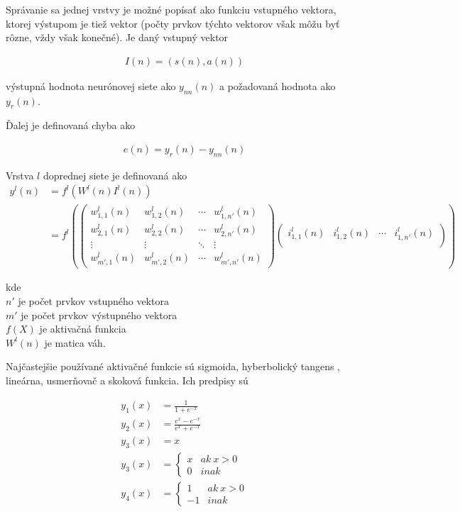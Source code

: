 Správanie sa jednej vrstvy je možné popísať ako funkciu vstupného vektora,
ktorej výstupom je tiež vektor (počty prvkov týchto vektorov však môžu byť rôzne,
vždy však konečné).
Je daný vstupný vektor

\begin{align}
I(n) = (s(n), a(n))
\label{eq:nn_input_vector}
\end{align}

výstupná hodnota neurónovej siete ako $y_{nn}(n)$ a požadovaná hodnota ako $y_{r}(n)$.

Ďalej je definovaná chyba ako

\begin{align}
e(n) = y_{r}(n) - y_{nn}(n)
\label{eq:nn_error}
\end{align}

Vrstva $l$ doprednej siete je definovaná ako
\begin{align}
y^l(n) &= f^l\left(W^l(n)I^l(n)\right) \nonumber \\
 &= f^l\left(
 \begin{pmatrix}
  w^l_{1,1}(n) & w^l_{1,2}(n) & \cdots & w^l_{1,n'}(n) \\
  w^l_{2,1}(n) & w^l_{2,2}(n) & \cdots & w^l_{2,n'}(n) \\
  \vdots  & \vdots  & \ddots & \vdots  \\
  w^l_{m',1}(n)  & w^l_{m',2}(n)  & \cdots & w^l_{m',n'}(n)
 \end{pmatrix}
 \begin{pmatrix}
  i^l_{1,1}(n) & i^l_{1,2}(n) & \cdots & i^l_{1,n'}(n) \\
 \end{pmatrix}
 \right)
 \label{eq:nn_layer}
\end{align}

kde \\
$n'$ je počet prvkov vstupného vektora \\
$m'$ je počet prvkov výstupného vektora \\
$f(X)$ je aktivačná funkcia \\
$W^l(n)$ je matica váh.

Najčastejšie používané aktivačné funkcie sú sigmoida, hyberbolický tangens , lineárna,
usmerňovač a skoková funkcia. Ich predpisy sú

\begin{align}
y_1(x) &= \frac{1}{1+e^{-x}} \\
y_2(x) &= \frac{e^{x} - e^{-x}}{e^{x} + e^{-x}} \\
y_3(x) &= x \\
y_3(x) &= \left\{
	\begin{array}{ll}
		x  & ak \ x > 0 \\
		0 & inak
	\end{array}
\right. \\
y_4(x) &= \left\{
	\begin{array}{ll}
		1  & ak \ x > 0 \\
		-1 & inak
	\end{array}
\right.
\label{eq:nn_transfer_function}
\end{align}


